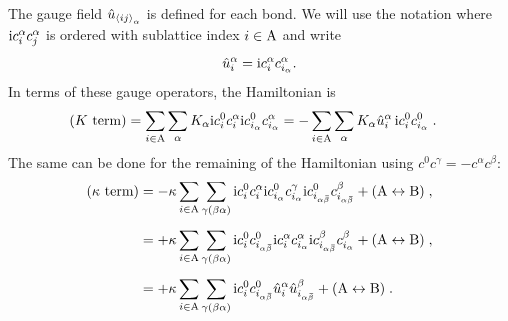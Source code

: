 The gauge field $\hat{u}_{\braket{ij}_\alpha}$ is defined for each bond. We will use the notation where $\mathrm{i} c_i^\alpha c_j^\alpha$ is ordered with sublattice index $i\in \mathrm{A}$ and write
\begin{equation}
    \hat{u}_i^\alpha = \mathrm{i} c_i^\alpha c_{i_\alpha}^\alpha  .
\end{equation}
In terms of these gauge operators, the Hamiltonian is
\begin{align}
(K\text{ term}) &= \sum_{i\in \mathrm{A}}\sum_{\alpha}  K_\alpha \mathrm{i} c_i^0 c_i^\alpha \mathrm{i} c_{i_\alpha}^0 c_{i_\alpha}^\alpha
    =-\sum_{i\in\mathrm A}\sum_{\alpha} K_{\alpha} \hat{u}_i^\alpha \, \mathrm{i} c_i^0 c_{i_\alpha}^0 \; .
\end{align}
The same can be done for the remaining of the Hamiltonian using $c^0 c^\gamma = - c^\alpha c^\beta$:
\begin{align}
(\kappa\text{ term})
&=- \kappa
    \sum_{i\in \mathrm{A}} \sum_{\gamma(\beta \alpha )}  \im  c_i^0 c_i^\alpha \im c_{i_{\alpha}}^0 c_{i_{\alpha}}^\gamma  \im c_{i_{\alpha\bar{\beta}}}^0 c_{i_{\alpha\bar{\beta}}}^\beta
    + (\rmA \leftrightarrow \rmB )
    \;,     \\[5pt]
    &=
    +  \kappa
    \sum_{i\in \mathrm{A}} \sum_{\gamma(\beta \alpha )}  \im  c_i^0  c_{i_{\alpha\bar{\beta}}}^0  \im  c_i^\alpha c_{i_{\alpha}}^\alpha  \im c_{i_{\alpha\bar{\beta}}}^\beta  c_{i_{\alpha}}^\beta
    + (\rmA \leftrightarrow \rmB )
    \; , \\[5pt]
    &=
    +  \kappa
    \sum_{i\in \mathrm{A}} \sum_{\gamma(\beta \alpha )}  \im  c_i^0  c_{i_{\alpha\bar{\beta}}}^0  \hat{u}_i^\alpha \hat{u}_{i_{\alpha\bar{\beta}}}^\beta
    + (\rmA \leftrightarrow \rmB )
    \; .
\end{align}
